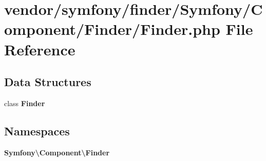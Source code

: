 \section{vendor/symfony/finder/\+Symfony/\+Component/\+Finder/\+Finder.php File Reference}
\label{_finder_8php}
\subsection*{Data Structures}
\begin{DoxyCompactItemize}
\item 
class {\bf Finder}
\end{DoxyCompactItemize}
\subsection*{Namespaces}
\begin{DoxyCompactItemize}
\item 
 {\bf Symfony\textbackslash{}\+Component\textbackslash{}\+Finder}
\end{DoxyCompactItemize}
